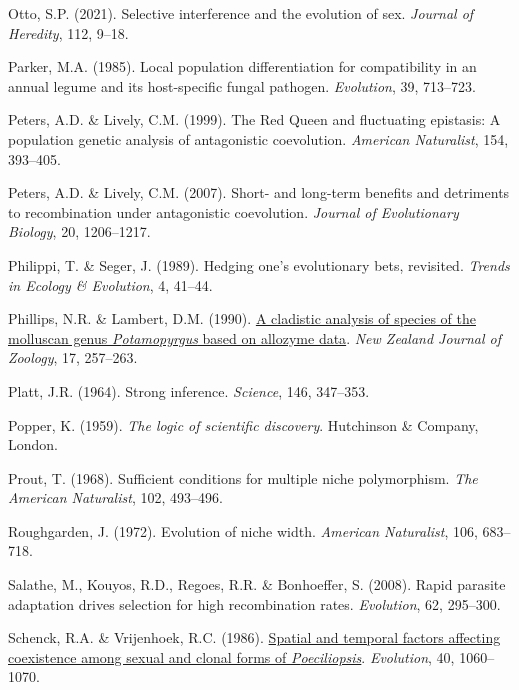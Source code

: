 \documentclass[
  letterpaper,
]{book}
\newlength{\cslhangindent}
\newenvironment{CSLReferences}[2] %
 {\begin{list}{}{%
  \setlength{\itemindent}{0pt}
  \setlength{\leftmargin}{0pt}
  \setlength{\parsep}{0pt}
  \ifodd #1
   \setlength{\leftmargin}{\cslhangindent}
   \setlength{\itemindent}{-1\cslhangindent}
  \fi
  \setlength{\itemsep}{#2\baselineskip}}}
 {\end{list}}
\begin{document}
\begin{CSLReferences}{1}{0}
Otto, S.P. (2021). Selective interference and the evolution of sex.
\emph{Journal of Heredity}, 112, 9--18.

Parker, M.A. (1985). Local population differentiation for compatibility
in an annual legume and its host-specific fungal pathogen.
\emph{Evolution}, 39, 713--723.

Peters, A.D. \& Lively, C.M. (1999). The {Red Queen} and fluctuating
epistasis: A population genetic analysis of antagonistic coevolution.
\emph{American Naturalist}, 154, 393--405.

Peters, A.D. \& Lively, C.M. (2007). Short- and long-term benefits and
detriments to recombination under antagonistic coevolution.
\emph{Journal of Evolutionary Biology}, 20, 1206--1217.

Philippi, T. \& Seger, J. (1989). Hedging one's evolutionary bets,
revisited. \emph{Trends in Ecology \& Evolution}, 4, 41--44.

Phillips, N.R. \& Lambert, D.M. (1990).
\href{https://doi.org/10.1080/03014223.1990.10422600}{A cladistic
analysis of species of the molluscan genus \emph{{P}otamopyrgus} based
on allozyme data}. \emph{New Zealand Journal of Zoology}, 17, 257--263.

Platt, J.R. (1964). Strong inference. \emph{Science}, 146, 347--353.

Popper, K. (1959). \emph{The logic of scientific discovery}. Hutchinson
\& Company, London.

Prout, T. (1968). Sufficient conditions for multiple niche polymorphism.
\emph{The American Naturalist}, 102, 493--496.

Roughgarden, J. (1972). Evolution of niche width. \emph{American
Naturalist}, 106, 683--718.

Salathe, M., Kouyos, R.D., Regoes, R.R. \& Bonhoeffer, S. (2008). Rapid
parasite adaptation drives selection for high recombination rates.
\emph{Evolution}, 62, 295--300.

Schenck, R.A. \& Vrijenhoek, R.C. (1986).
\href{https://doi.org/10.1111/j.1558-5646.1986.tb00573.x}{Spatial and
temporal factors affecting coexistence among sexual and clonal forms of
\emph{{P}oeciliopsis}}. \emph{Evolution}, 40, 1060--1070.


\end{CSLReferences}
\end{document}

